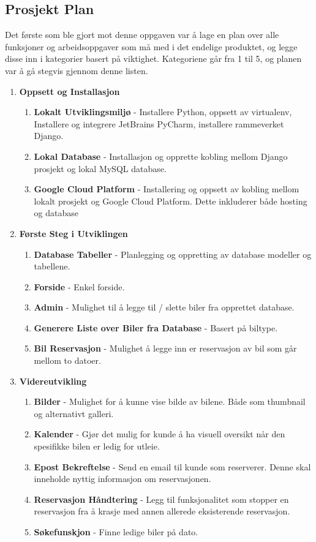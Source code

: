 \subsection{Prosjekt Plan} \label{kravliste2}
Det første som ble gjort mot denne oppgaven var å lage en plan over alle funksjoner og arbeidsoppgaver som må med i det endelige produktet, og legge disse inn i kategorier basert på viktighet. Kategoriene går fra 1 til 5, og planen var å gå stegvis gjennom denne listen. 
 \begin{enumerate}
 
  \item \textbf{Oppsett og Installasjon}
  \begin{enumerate}
  	\item \textbf{Lokalt Utviklingsmiljø} - Installere Python, oppsett av virtualenv, Installere og integrere JetBrains PyCharm, installere rammeverket Django.
  	\item \textbf{Lokal Database} - Installasjon og opprette kobling mellom Django prosjekt og lokal MySQL database.
  	\item \textbf{Google Cloud Platform} - Installering og oppsett av kobling mellom lokalt prosjekt og Google Cloud Platform. Dette inkluderer både hosting og database
  \end{enumerate}
  
  \item \textbf{Første Steg i Utviklingen}
  \begin{enumerate}
  	\item \textbf{Database Tabeller} - Planlegging og oppretting av database modeller og tabellene.
  	\item \textbf{Forside} - Enkel forside.
  	\item \textbf{Admin} - Mulighet til å legge til / slette biler fra opprettet database.
  	\item \textbf{Generere Liste over Biler fra Database} - Basert på biltype.
  	\item \textbf{Bil Reservasjon} - Mulighet å legge inn er reservasjon av bil som går mellom to datoer.
  \end{enumerate}
  
  \item \textbf{Videreutvikling}
  \begin{enumerate} 
  	\item \textbf{Bilder} - Mulighet for å kunne vise bilde av bilene. Både som thumbnail og alternativt galleri.
	\item \textbf{Kalender} - Gjør det mulig for kunde å ha visuell oversikt når den spesifikke bilen er ledig for utleie. 
	\item \textbf{Epost Bekreftelse} - Send en email til kunde som reserverer. Denne skal inneholde nyttig informasjon om reservasjonen.
	\item \textbf{Reservasjon Håndtering} - Legg til funksjonalitet som stopper en reservasjon fra å krasje med annen allerede eksisterende reservasjon.
	\item \textbf{Søkefunskjon} - Finne ledige biler på dato.
  \end{enumerate}
  

\end{enumerate}
